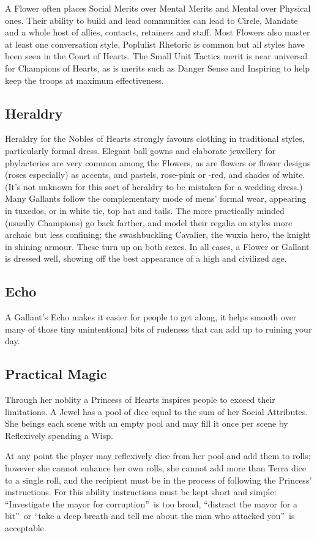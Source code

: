 A Flower often places Social Merits over Mental Merits and Mental over Physical ones. Their ability to build and lead communities can lead to Circle, Mandate and a whole host of allies, contacts, retainers and staff. Most Flowers also master at least one conversation style, Poplulist Rhetoric is common but all styles have been seen in the Court of Hearts. The Small Unit Tactics merit is near universal for Champions of Hearts, as is merits such as Danger Sense and Inspiring to help keep the troops at maximum effectiveness. 

\subsection*{Heraldry}

Heraldry for the Nobles of Hearts strongly favours clothing in traditional styles, particularly formal dress. Elegant ball gowns and elaborate jewellery for phylacteries are very common among the Flowers, as are flowers or flower designs (roses especially) as accents, and pastels, rose-pink or -red, and shades of white. (It's not unknown for this sort of heraldry to be mistaken for a wedding dress.) Many Gallants follow the complementary mode of mens' formal wear, appearing in tuxedos, or in white tie, top hat and tails. The more practically minded (usually Champions) go back farther, and model their regalia on styles more archaic but less confining; the swashbuckling Cavalier, the wuxia hero, the knight in shining armour. These turn up on both sexes. In all cases, a Flower or Gallant is dressed well, showing off the best appearance of a high and civilized age.

\subsection*{Echo}
A Gallant's Echo makes it easier for people to get along, it helps smooth over many of those tiny unintentional bits of rudeness that can add up to ruining your day.
\subsection*{Practical Magic}
Through her noblity  a Princess of Hearts inspires people to exceed their limitations. A Jewel has a pool of dice equal to the sum of her Social Attributes. She beings each scene with an empty pool and may fill it once per scene by Reflexively spending a Wisp.

At any point the player may reflexively dice from her pool and add them to rolls; however she cannot enhance her own rolls, she cannot add more than Terra dice to a single roll, and the recipient must be in the process of following the Princess' instructions. For this ability instructions must be kept short and simple: \textquotedblleft Investigate the mayor for corruption\textquotedblright\, is too broad, \textquotedblleft distract the mayor for a bit\textquotedblright\, or \textquotedblleft take a deep breath and tell me about the man who attacked you\textquotedblright\, is acceptable.


